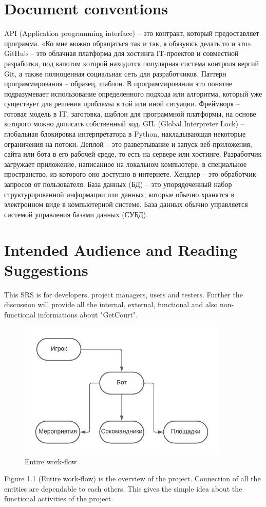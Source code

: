 \documentclass{scrreprt}
\begin{document}
\section{Document conventions}
API (Application programming interface) – это контракт, который предоставляет программа. «Ко мне можно обращаться так и так, я обязуюсь делать то и это».
GitHub – это облачная платформа для хостинга IT-проектов и совместной разработки, под капотом которой находится популярная система контроля версий Git, а также полноценная социальная сеть для разработчиков.
Паттерн программирования – образец, шаблон. В программировании это понятие подразумевает использование определенного подхода или алгоритма, который уже существует для решения проблемы в той или иной ситуации.
Фреймворк – готовая модель в IT, заготовка, шаблон для программной платформы, на основе которого можно дописать собственный код.
GIL (Global Interpreter Lock) – глобальная блокировка интерпретатора в Python, накладывающая некоторые ограничения на потоки.
Деплой – это развертывание и запуск веб-приложения, сайта или бота в его рабочей среде, то есть на сервере или хостинге. Разработчик загружает приложение, написанное на локальном компьютере, в специальное пространство, из которого оно доступно в интернете.
Хендлер – это обработчик запросов от пользователя.
База данных (БД) – это упорядоченный набор структурированной информации или данных, которые обычно хранятся в электронном виде в компьютерной системе. База данных обычно управляется системой управления базами данных (СУБД).



\section{Intended Audience and Reading Suggestions}
This SRS is for developers, project managers, users and testers. Further the discussion will provide all the internal, external, functional and also non-functional informations about "GetCourt".
\newline
\begin{figure}
    \centering
    \includegraphics[width=10cm]{project scope.jpeg}
    \caption{Entire work-flow}
    \label{fig:IICT WEBSITE}
\end{figure}
\newline
Figure 1.1 (Entire work-flow) is the overview of the project. Connection of all the entities are dependable to each others.  This gives the simple idea about the functional activities of the project. 
\newline
\end{document}
